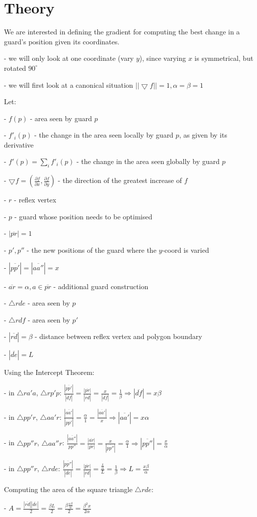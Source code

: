 \section{Theory}

We are interested in defining the gradient for computing the best change in a guard's position given its coordinates.

- we will only look at one coordinate (vary $y$), since varying $x$ is symmetrical, but rotated $90^\circ$

- we will first look at a canonical situation $||\bigtriangledown f|| = 1, \alpha = \beta = 1$

Let:

- $f(p)$ - area seen by guard $p$

- $f'_i(p)$ - the change in the area seen locally by guard $p$, as given by its derivative

- $f'(p) = \sum_i f'_i(p)$ - the change in the area seen globally by guard $p$

- $\bigtriangledown f = (\frac{\partial f}{\partial x}, \frac{\partial f}{\partial y})$ - the direction of the greatest increase of $f$

- $r$ - reflex vertex

- $p$ - guard whose position needs to be optimised

- $|\overline{pr}| = 1$

- $p', p''$ - the new positions of the guard where the $y$-coord is varied

    - $|\overline{pp'}| = |\overline{aa''}| = x$

- $\overline{ar} = \alpha, a \in \overline{pr}$ - additional guard construction

- $\triangle rde$ - area seen by $p$

    - $\triangle rdf$ - area seen by $p'$

- $|\overline{rd}| = \beta$ - distance between reflex vertex and polygon boundary

- $|\overline{de}| = L$

Using the Intercept Theorem:

- in $\triangle ra'a$, $\triangle rp'p$: $\frac{|\overline{pp'}|}{|\overline{df}|} = \frac{|\overline{pr}|}{|\overline{rd}|} = \frac{x}{|\overline{df}|} = \frac{1}{\beta} \Rightarrow |\overline{df}| = x\beta$

- in $\triangle pp'r$, $\triangle aa'r$: $\frac{|\overline{aa'}|}{|\overline{pp'}|} = \frac{\alpha}{1} = \frac{|\overline{aa'}|}{x} \Rightarrow |\overline{aa'}| = x\alpha$

- in $\triangle pp''r$, $\triangle aa''r$: $\frac{|\overline{aa''}|}{pp''} = \frac{|\overline{ar}|}{|\overline{pr}|} = \frac{x}{|\overline{pp''}|} = \frac{\alpha}{1} \Rightarrow |\overline{pp''}| = \frac{x}{\alpha}$

- in $\triangle pp''r$, $\triangle rde$: $\frac{|\overline{pp''}|}{|\overline{de}|} = \frac{|\overline{pr}|}{|\overline{rd}|} = \frac{\frac{x}{\alpha}}{L} = \frac{1}{\beta} \Rightarrow L = \frac{x\beta}{\alpha}$

Computing the area of the square triangle $\triangle rde$:

- $A = \frac{|\overline{rd}||\overline{de}|}{2} = \frac{\beta L}{2} = \frac{\beta \frac{x\beta}{\alpha}}{2} = \frac{\beta^2x}{2\alpha}$